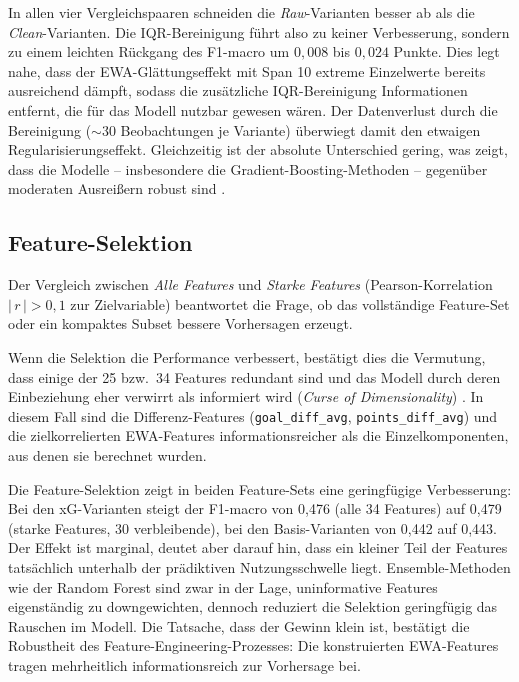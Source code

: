 In allen vier Vergleichspaaren schneiden die \emph{Raw}-Varianten besser
ab als die \emph{Clean}-Varianten. Die IQR-Bereinigung führt also zu
keiner Verbesserung, sondern zu einem leichten Rückgang des F1-macro um
$0{,}008$ bis $0{,}024$ Punkte. Dies legt nahe, dass der EWA-Glättungseffekt
mit Span 10 extreme Einzelwerte bereits ausreichend dämpft, sodass die
zusätzliche IQR-Bereinigung Informationen entfernt, die für das Modell
nutzbar gewesen wären. Der Datenverlust durch die Bereinigung
($\sim$30 Beobachtungen je Variante) überwiegt damit den etwaigen
Regularisierungseffekt. Gleichzeitig ist der absolute Unterschied gering,
was zeigt, dass die Modelle -- insbesondere die Gradient-Boosting-Methoden --
gegenüber moderaten Ausreißern robust sind \cite{JamesEtAl2021}.

\subsection{Feature-Selektion}

Der Vergleich zwischen \emph{Alle Features} und \emph{Starke Features}
(Pearson-Korrelation $|\,r\,| > 0{,}1$ zur Zielvariable) beantwortet
die Frage, ob das vollständige Feature-Set oder ein kompaktes Subset
bessere Vorhersagen erzeugt.

Wenn die Selektion die Performance verbessert, bestätigt dies die
Vermutung, dass einige der 25 bzw.\ 34 Features redundant sind und
das Modell durch deren Einbeziehung eher verwirrt als informiert
wird (\textit{Curse of Dimensionality}) \cite{Bellman1961}. In diesem
Fall sind die Differenz-Features (\texttt{goal\_diff\_avg},
\texttt{points\_diff\_avg}) und die zielkorrelierten EWA-Features
informationsreicher als die Einzelkomponenten, aus denen sie berechnet
wurden.

Die Feature-Selektion zeigt in beiden Feature-Sets eine geringfügige
Verbesserung: Bei den xG-Varianten steigt der F1-macro von 0,476 (alle
34 Features) auf 0,479 (starke Features, 30 verbleibende), bei den
Basis-Varianten von 0,442 auf 0,443. Der Effekt ist marginal, deutet
aber darauf hin, dass ein kleiner Teil der Features tatsächlich
unterhalb der prädiktiven Nutzungsschwelle liegt. Ensemble-Methoden wie
der Random Forest sind zwar in der Lage, uninformative Features
eigenständig zu downgewichten, dennoch reduziert die Selektion geringfügig
das Rauschen im Modell. Die Tatsache, dass der Gewinn klein ist, bestätigt
die Robustheit des Feature-Engineering-Prozesses: Die konstruierten
EWA-Features tragen mehrheitlich informationsreich zur Vorhersage bei.

